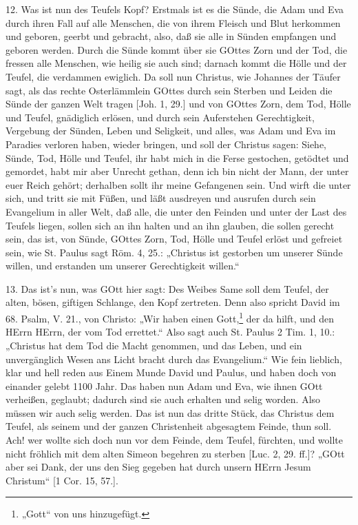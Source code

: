 12. Was ist nun des Teufels Kopf? Erstmals ist es die Sünde, die Adam und Eva durch ihren Fall auf alle Menschen, die von ihrem Fleisch und Blut herkommen und geboren, geerbt und gebracht, also, daß sie alle in Sünden empfangen und geboren werden. Durch die Sünde kommt über sie GOttes Zorn und der Tod, die fressen alle Menschen, wie heilig sie
auch sind; darnach kommt die Hölle und der Teufel, die verdammen ewiglich. Da soll nun Christus, wie Johannes der Täufer sagt, als das rechte Osterlämmlein GOttes durch sein Sterben und Leiden die Sünde der ganzen Welt tragen [Joh. 1, 29.] und von GOttes Zorn, dem Tod, Hölle und Teufel, gnädiglich erlösen, und durch sein Auferstehen Gerechtigkeit, Vergebung der Sünden, Leben und Seligkeit, und alles, was Adam und Eva im Paradies verloren haben, wieder bringen, und soll der Christus sagen: Siehe, Sünde, Tod, Hölle und Teufel, ihr habt mich in die Ferse gestochen, getödtet und gemordet, habt mir aber Unrecht gethan, denn ich bin nicht der Mann, der unter euer Reich gehört; derhalben sollt ihr meine Gefangenen sein. Und wirft die unter sich, und tritt sie mit Füßen, und läßt ausdreyen und ausrufen durch sein Evangelium in aller Welt, daß alle, die unter den Feinden und unter der Last des Teufels liegen, sollen sich an ihn halten und an ihn glauben, die sollen gerecht sein, das ist, von Sünde, GOttes Zorn, Tod, Hölle und Teufel erlöst und gefreiet sein, wie St. Paulus sagt Röm. 4, 25.: „Christus ist gestorben um unserer Sünde willen, und erstanden um unserer Gerechtigkeit willen.“

13. Das ist’s nun, was GOtt hier sagt: Des Weibes Same soll dem Teufel, der alten, bösen, giftigen Schlange, den Kopf zertreten. Denn also spricht David im 68. Psalm, V. 21., von Christo: „Wir haben einen Gott,\footnote{„Gott“ von uns hinzugefügt.} der da hilft, und den HErrn HErrn, der vom Tod errettet.“ Also sagt auch St. Paulus 2 Tim. 1, 10.: „Christus hat dem Tod die Macht genommen, und das Leben, und ein unvergänglich Wesen ans Licht bracht durch das Evangelium.“ Wie fein lieblich, klar und hell reden aus Einem Munde David und Paulus, und haben doch von einander gelebt 1100 Jahr. Das haben nun Adam und Eva, wie ihnen GOtt verheißen, geglaubt; dadurch sind sie auch erhalten und selig worden. Also müssen wir auch selig werden. Das ist nun das dritte Stück, das Christus dem Teufel, als seinem und der ganzen Christenheit abgesagtem Feinde, thun soll. Ach! wer wollte sich doch nun vor dem Feinde, dem Teufel, fürchten, und wollte nicht fröhlich mit dem alten Simeon begehren zu sterben [Luc. 2, 29. ff.]? „GOtt aber sei Dank, der uns den Sieg gegeben hat durch unsern HErrn Jesum Christum“ [1 Cor. 15, 57.].

